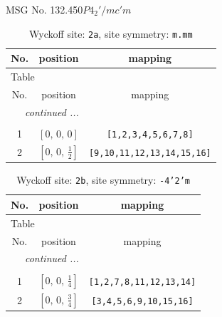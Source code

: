 \documentclass[fleqn,8pt]{jsarticle}
\begin{document}
\setcounter{MaxMatrixCols}{32}

\renewcommand{\tablename}{Table~}
\renewcommand{\figurename}{Figure~}
\begin{center}
\LARGE
MSG No. 132.450\quad$P4_{2}'/mc'm$
\end{center}
\renewcommand{\arraystretch}{1.2}
\begin{longtable}{ccc}
\caption{Wyckoff site: {\tt 2a}, site symmetry: {\tt m.mm}}
 \\
 \hline \hline
No. & position & mapping \\ \hline \endfirsthead

\multicolumn{2}{l}{\tablename\ \thetable{}} \\
 \hline \hline
No. & position & mapping \\ \hline \endhead

 \hline \hline
\multicolumn{2}{r}{\footnotesize\it continued ...} \\ \endfoot

 \hline \hline
\multicolumn{2}{r}{} \\ \endlastfoot

1 & $\left[ 0,\, 0,\, 0 \right]$ & {\tt [1,2,3,4,5,6,7,8]} \\ \hline
2 & $\left[ 0,\, 0,\, \frac{1}{2} \right]$ & {\tt [9,10,11,12,13,14,15,16]} \\
\end{longtable}
\renewcommand{\arraystretch}{1.2}
\begin{longtable}{ccc}
\caption{Wyckoff site: {\tt 2b}, site symmetry: {\tt -4'2'm}}
 \\
 \hline \hline
No. & position & mapping \\ \hline \endfirsthead

\multicolumn{2}{l}{\tablename\ \thetable{}} \\
 \hline \hline
No. & position & mapping \\ \hline \endhead

 \hline \hline
\multicolumn{2}{r}{\footnotesize\it continued ...} \\ \endfoot

 \hline \hline
\multicolumn{2}{r}{} \\ \endlastfoot

1 & $\left[ 0,\, 0,\, \frac{1}{4} \right]$ & {\tt [1,2,7,8,11,12,13,14]} \\ \hline
2 & $\left[ 0,\, 0,\, \frac{3}{4} \right]$ & {\tt [3,4,5,6,9,10,15,16]} \\
\end{longtable}
\end{document}
